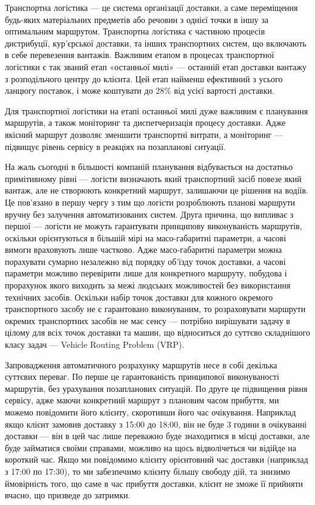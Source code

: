 Транспортна логістика --- це система організації доставки, а саме переміщення будь-яких матеріальних предметів або речовин з однієї точки в іншу за оптимальним маршрутом. Транспортна логістика є частиною процесів дистрибуції, кур’єрської доставки, та інших транспортних систем, що включають в себе перевезення вантажів. Важливим етапом в процесах транспортної логістики є так званий етап «останньої милі» --- останній етап доставки вантажу з розподільчого центру до клієнта. Цей етап найменш ефективний з усього ланцюгу поставок, і може коштувати до 28\% від усієї вартості доставки. \cite{Scott_2009}

Для транспортної логістики на етапі останньої милі дуже важливим є планування маршрутів, а також моніторинг та диспетчеризація процесу доставки. Адже якісний маршрут дозволяє зменшити транспортні витрати, а моніторинг --- підвищує рівень сервісу в реакціях на позапланові ситуації. 

На жаль сьогодні в більшості компаній  планування відбувається на достатньо примітивному рівні --- логісти визначають який транспортний засіб повезе який вантаж, але не створюють конкретний маршрут, залишаючи це рішення на водіїв. Це пов’язано в першу чергу з тим що логісти розроблюють планові маршрути вручну без залучення автоматизованих систем. Друга причина, що випливає з першої --- логісти не можуть гарантувати принципову виконуваність маршрутів, оскільки орієнтуються в більшій мірі на масо-габаритні параметри, а часові вимоги враховують лише частково. Адже масо-габаритні параметри можна порахувати сумарно незалежно від порядку об’їзду точок доставки, а часові параметри можливо перевірити лише для конкретного маршруту, побудова і прорахунок якого виходить за межі людських можливостей без використання технічних засобів. Оскільки набір точок доставки для кожного окремого транспортного засобу не є гарантовано виконуваним, то розраховувати маршрути окремих транспортних засобів не має сенсу --- потрібно вирішувати задачу в цілому для всіх точок доставки та машин, що відноситься до суттєво складнішого класу задач --- Vehicle Routing Problem (VRP).

Запровадження автоматичного розрахунку маршрутів несе в собі декілька суттєвих переваг. По перше це гарантованість принципової виконуваності маршрутів, без урахування позапланових ситуацій. По друге це підвищення рівня сервісу, адже маючи конкретний маршрут з плановим часом прибуття, ми можемо повідомити його клієнту, скоротивши його час очікування. Наприклад якщо клієнт замовив доставку з 15:00 до 18:00, він не буде 3 години  в очікуванні доставки --- він в цей час лише переважно буде знаходитися в місці доставки, але буде займатися своїми справами, можливо на щось відволічеться чи відійде на короткий час. Якщо ми повідомимо клієнту орієнтовний час доставки (наприклад з 17:00 по 17:30), то ми забезпечимо клієнту більшу свободу дій, та знизимо ймовірність того, що саме в час прибуття доставки, клієнт не зможе її прийняти вчасно, що призведе до затримки.

